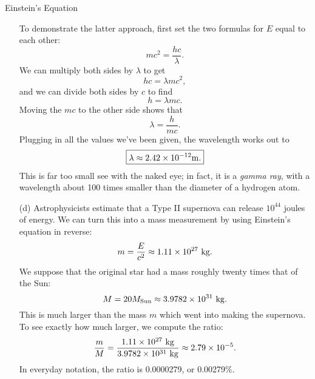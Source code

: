 \documentclass[12pt]{article}
\begin{document}
\begin{probdesc}{8}{Einstein's Equation}
\begin{enumerate}
  To demonstrate the latter approach, first set the two formulas for
  $E$ equal to each other:
  \begin{equation}
    mc^2 = \frac{hc}{\lambda}.
  \end{equation}
  We can multiply both sides by $\lambda$ to get
  \begin{equation}
    hc = \lambda m c^2,
  \end{equation}
  and we can divide both sides by $c$ to find
  \begin{equation}
    h = \lambda m c.
  \end{equation}
  Moving the $mc$ to the other side shows that
  \begin{equation}
    \lambda = \frac{h}{mc}.
  \end{equation}
  Plugging in all the values we've been given, the wavelength works
  out to
  \begin{equation}
    \boxed{\lambda \approx 2.42 \times 10^{-12} {\rm m}.}
  \end{equation}
  This is far too small see with the naked eye; in fact, it is a {\em
  gamma ray}, with a wavelength about 100 times smaller than the
  diameter of a hydrogen atom.


\item[(d)] Astrophysicists estimate that a Type II supernova can
  release $10^{44}$ joules of energy.  We can turn this into a mass
  measurement by using Einstein's equation in reverse:
  \begin{equation}
    m = \frac{E}{c^2} \approx 1.11\times10^{27} {\rm\ kg.}
  \end{equation}
  We suppose that the original star had a mass roughly twenty times
  that of the Sun:
  \begin{equation}
    M = 20 M_{\rm Sun} \approx 3.9782\times10^{31} {\rm\ kg.}
  \end{equation}
  This is much larger than the mass $m$ which went into making the
  supernova.  To see exactly how much larger, we compute the ratio:
  \begin{equation}
    \frac{m}{M} = 
    \frac{1.11\times10^{27} \rm\ kg}{3.9782\times10^{31} \rm\ kg}
    \approx 2.79\times10^{-5}.
  \end{equation}
  In everyday notation, the ratio is 0.0000279, or 0.00279\%.
\end{enumerate}
\end{probdesc}
\end{document}
